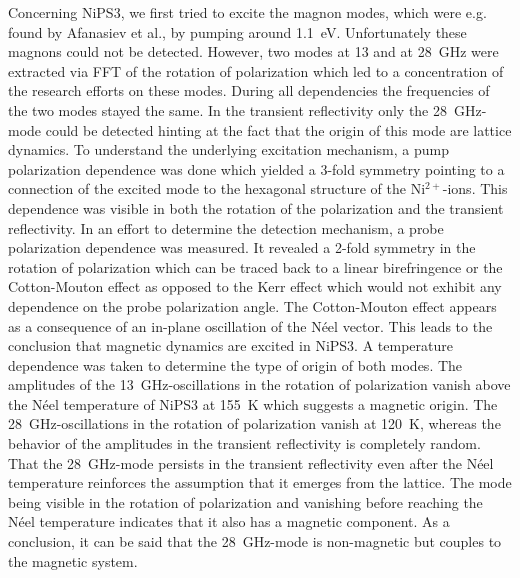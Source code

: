Concerning NiPS3, we first tried to excite the magnon modes, which were e.g. found by Afanasiev et al., by pumping around \qty{1.1}{eV}.
Unfortunately these magnons could not be detected.
However, two modes at 13 and at \qty{28}{GHz} were extracted via FFT of the rotation of polarization which led to a concentration of the research efforts on these modes.
During all dependencies the frequencies of the two modes stayed the same.
In the transient reflectivity only the \qty{28}{GHz}-mode could be detected hinting at the fact that the origin of this mode are lattice dynamics.
To understand the underlying excitation mechanism, a pump polarization dependence was done which yielded a 3-fold symmetry pointing to a connection of the excited mode to the hexagonal structure of the Ni$^{2+}$-ions.
This dependence was visible in both the rotation of the polarization and the transient reflectivity.
In an effort to determine the detection mechanism, a probe polarization dependence was measured.
It revealed a 2-fold symmetry in the rotation of polarization which can be traced back to a linear birefringence or the Cotton-Mouton effect as opposed to the Kerr effect which would not exhibit any dependence on the probe polarization angle.
The Cotton-Mouton effect appears as a consequence of an in-plane oscillation of the Néel vector.
This leads to the conclusion that magnetic dynamics are excited in NiPS3.
A temperature dependence was taken to determine the type of origin of both modes.
The amplitudes of the \qty{13}{GHz}-oscillations in the rotation of polarization vanish above the Néel temperature of NiPS3 at \qty{155}{K} which suggests a magnetic origin.
The \qty{28}{GHz}-oscillations in the rotation of polarization vanish at \qty{120}{K}, whereas the behavior of the amplitudes in the transient reflectivity is completely random.
That the \qty{28}{GHz}-mode persists in the transient reflectivity even after the Néel temperature reinforces the assumption that it emerges from the lattice.
The mode being visible in the rotation of polarization and vanishing before reaching the Néel temperature indicates that it also has a magnetic component.
As a conclusion, it can be said that the \qty{28}{GHz}-mode is non-magnetic but couples to the magnetic system.

